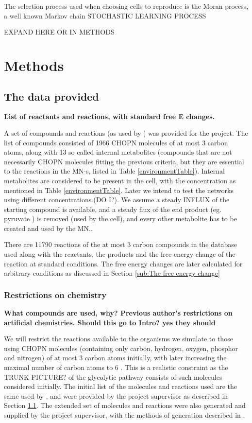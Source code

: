 \documentclass[10pt,a4paper]{article}
\begin{document}
	The selection process used when choosing cells to reproduce is the Moran process, a well known Markov chain \cite[]{absorptionofmoran} STOCHASTIC LEARNING PROCESS
	
	EXPAND HERE OR IN METHODS


	
\section{Methods}
\label{sec:methods}

\subsection{The data provided}
\label{sub:What was we provided with?}
\textbf{List of reactants and reactions, with standard free E changes. }



A set of compounds and reactions (as used by \cite[]{BartekLower}) was provided for the project. The list of compounds consisted of 1966 CHOPN molecules of at most 3 carbon atoms, along with 13 so called internal metabolites (compounds that are not necessarily CHOPN molecules fitting the previous criteria, but they are essential to the reactions in the MN-s, listed in Table \ref{environmentTable}). Internal metabolites are considered to be present in the cell, with the concentration as mentioned in Table \ref{environmentTable}. Later we intend to test the networks using different concentrations.(DO I?). We assume a steady INFLUX of the starting compound is available, and a steady flux of the end product (eg. pyruvate ) is removed (used by the cell), and every other metabolite has to be created and used by the MN.. 
	
	There are 11790 reactions of the at most 3 carbon compounds in the database used along with the reactants, the products and the free energy change of the reaction at standard conditions. The free energy changes are later calculated for arbitrary conditions as discussed in Section \ref{sub:The free energy change}
	
\subsubsection{Restrictions on chemistry}
\label{ssub:Restrictions on chemistry}
\textbf{
What compounds are used, why?
Previous author's restrictions on artificial chemistries. Should this go to Intro? yes they should }

	We will restrict the reactions available to the organisms we simulate to those using CHOPN molecules (containing only carbon, hydrogen, oxygen, phosphor and nitrogen) of at most 3 carbon atoms initially, with later increasing the maximal number of carbon atoms to $6$ . This is a realistic constraint as the TRUNK PICTURE? of the glycolytic pathway consists of such molecules considered initially. The initial list of the molecules and reactions used are the same used by \cite{BartekLower}, and were provided by the project supervisor as described in Section \ref{sub:What was we provided with?}. The extended set of molecules and reactions were also generated and supplied by the project supervisor, with the methods of generation described in \cite[]{BartekLower}.
\end{document}
